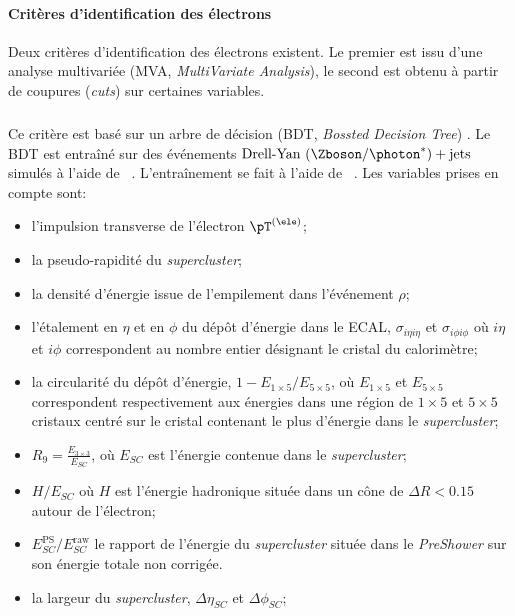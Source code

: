\paragraph{Critères d'identification des électrons}
Deux critères d'identification des électrons existent.
Le premier est issu d'une analyse multivariée (MVA, \emph{MultiVariate Analysis}), le second est obtenu à partir de coupures (\emph{cuts}) sur certaines variables.
\subparagraph{\EleIDMVA}
Ce critère est basé sur un arbre de décision (BDT, \emph{Bossted Decision Tree}) \cite{cmsElectronMVA}.
Le BDT est entraîné sur des événements $\text{Drell-Yan ($\Zboson/\photon^*$)} + \text{jets}$ simulés à l'aide de \MADGRAPH~\cite{madgraph5}.
L'entraînement se fait à l'aide de \XGBOOST~\cite{xgboost}.
Les variables prises en compte sont:
\begin{itemize}
\item l'impulsion transverse de l'électron $\pT^{(\ele)}$;
\item la pseudo-rapidité du \emph{supercluster};
\item la densité d'énergie issue de l'empilement dans l'événement $\rho$;

\item l'étalement en $\eta$ et en $\phi$ du dépôt d'énergie dans le ECAL, $\sigma_{i\eta i\eta}$ et $\sigma_{i\phi i\phi}$ où $i\eta$ et $i\phi$ correspondent au nombre entier désignant le cristal du calorimètre;
\item la circularité du dépôt d'énergie, $1- E_{1\times5}/E_{5\times5}$, où $ E_{1\times5}$ et $E_{5\times5}$ correspondent respectivement aux énergies dans une région de $1\times5$ et $5\times5$ cristaux centré sur le cristal contenant le plus d'énergie dans le \emph{supercluster};
\item $R_9 = \frac{E_{3\times3}}{E_{SC}}$, où $E_{SC}$ est l'énergie contenue dans le \emph{supercluster};
\item $H/E_{SC}$ où $H$ est l'énergie hadronique située dans un cône de $\Delta R < \num{0.15}$ autour de l'électron;
\item $E_{SC}^\text{PS}/E_{SC}^\text{raw}$ le rapport de l'énergie du \emph{supercluster} située dans le \emph{PreShower} sur son énergie totale non corrigée.
\item la largeur du \emph{supercluster}, $\Delta \eta_{SC}$ et $\Delta \phi_{SC}$;


\end{itemize}
